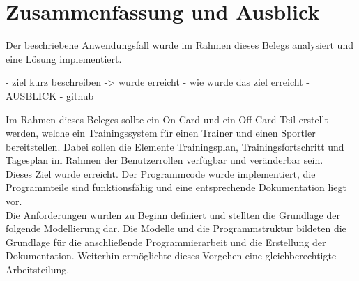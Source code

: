 \clearpage
\section{Zusammenfassung und Ausblick}
\label{sec:4}
Der beschriebene Anwendungsfall wurde im Rahmen dieses Belegs analysiert und eine Lösung implementiert. 

- ziel kurz beschreiben -> wurde erreicht
- wie wurde das ziel erreicht
- AUSBLICK
- github

Im Rahmen dieses Beleges sollte ein On-Card und ein Off-Card Teil erstellt werden, welche ein Trainingssystem für einen Trainer und einen Sportler bereitstellen.
Dabei sollen die Elemente Trainingsplan, Trainingsfortschritt und Tagesplan im Rahmen der Benutzerrollen verfügbar und veränderbar sein.
\\
Dieses Ziel wurde erreicht. Der Programmcode wurde implementiert, die Programmteile sind funktionsfähig und eine entsprechende Dokumentation liegt vor.
\\
Die Anforderungen wurden zu Beginn definiert und stellten die Grundlage der folgende Modellierung dar.
Die Modelle und die Programmstruktur bildeten die Grundlage für die anschließende Programmierarbeit und die Erstellung der Dokumentation.
Weiterhin ermöglichte dieses Vorgehen eine gleichberechtigte Arbeitsteilung.
\\
